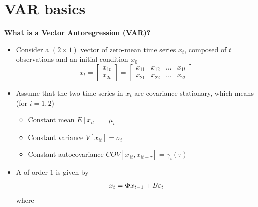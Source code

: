
\section{VAR basics}

\begin{frame}
\vspace{3cm}\color{title} 
\end{frame}


\begin{frame}
{\textbf{What is a Vector Autoregression (VAR)?}}

\begin{itemize}
\item Consider a $(2\times 1)$ vector of zero-mean time series $x_{t}$,
composed of $t$ observations and an initial condition $x_{0}$%
\begin{equation*}
x_{t}=\left[ 
\begin{array}{c}
x_{1t} \\ 
x_{2t}%
\end{array}%
\right] =\left[ 
\begin{array}{cccc}
x_{11} & x_{12} & ... & x_{1t} \\ 
x_{21} & x_{22} & ... & x_{2t}%
\end{array}%
\right]
\end{equation*}%
\pause\medskip

\item Assume that the two time series in $x_t$ are covariance stationary,
which means (for $i=1,2$)\smallskip

\begin{itemize}
\item Constant mean $E[x_{it}]=\mu_{i}$\medskip

\item Constant variance $V[x_{it}]=\sigma_{i}$\medskip

\item Constant autocovariance $COV[x_{it},x_{it+\tau}]=\gamma_{i}(\tau)$
\end{itemize}

\pause\bigskip

\item A {} of order $1$ is given by%
\begin{equation*}
x_{t}=\Phi x_{t-1}+B\varepsilon _{t}\vspace{-0.3cm}
\end{equation*}%
where\smallskip


\end{itemize}
\end{frame}
